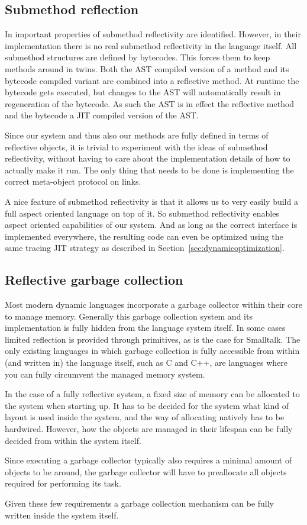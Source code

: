 \documentclass{article}
\newcommand{\secref}[1]{Section~\ref{sec:#1}}
\begin{document}
\subsection{Submethod reflection}
In \cite{submethod reflectivity} important properties of submethod
reflectivity are identified. However, in their implementation there is
no real submethod reflectivity in the language itself. All submethod
structures are defined by bytecodes. This forces them to keep methods
around in twins. Both the AST compiled version of a method and
its bytecode compiled variant are combined into a reflective method.
At runtime the bytecode gets executed, but changes to the AST will
automatically result in regeneration of the bytecode. As such the AST
is in effect the reflective method and the bytecode a JIT compiled
version of the AST. 

Since our system and thus also our methods are fully defined in terms
of reflective objects, it is trivial to experiment with the ideas of
submethod reflectivity, without having to care about the
implementation details of how to actually make it run. The only thing
that needs to be done is implementing the correct meta-object protocol
on links.

A nice feature of submethod reflectivity is that it allows us to very
easily build a full aspect oriented language on top of it. So
submethod reflectivity enables aspect oriented capabilities of our
system. And as long as the correct interface is implemented
everywhere, the resulting code can even be optimized using the same
tracing JIT strategy as described in \secref{dynamicoptimization}.

\subsection{Reflective garbage collection}
Most modern dynamic languages incorporate a garbage collector within
their core to manage memory. Generally this garbage collection system
and its implementation is fully hidden from the language system
itself. In some cases limited reflection is provided through
primitives, as is the case for Smalltalk. The only existing languages
in which garbage collection is fully accessible from within (and
written in) the language itself, such as C and C++, are languages
where you can fully circumvent the managed memory system.

In the case of a fully reflective system, a fixed size of memory can
be allocated to the system when starting up. It has to be decided for
the system what kind of layout is used inside the system, and the way
of allocating natively has to be hardwired. However, how the objects
are managed in their lifespan can be fully decided from within the
system itself.

Since executing a garbage collector typically also requires a minimal
amount of objects to be around, the garbage collector will have to
preallocate all objects required for performing its task.

Given these few requirements a garbage collection mechanism can be
fully written inside the system itself. 
\end{document}
